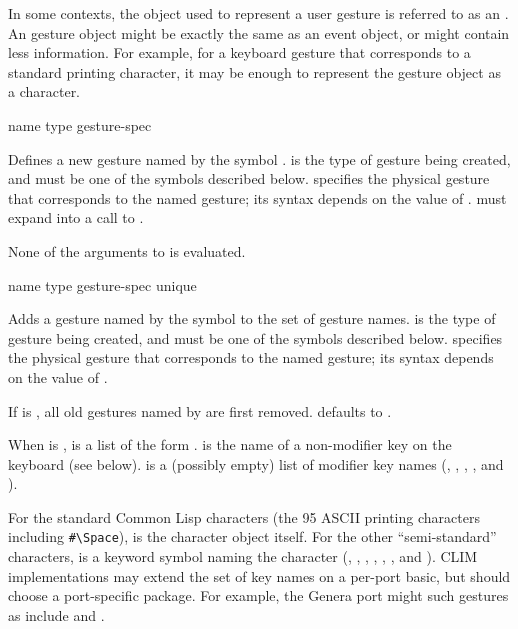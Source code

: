 In some contexts, the object used to represent a user gesture is referred to as
an .  An gesture object might be exactly the same as an
event object, or might contain less information.  For example, for a keyboard
gesture that corresponds to a standard printing character, it may be enough to
represent the gesture object as a character.


 {name type gesture-spec}

Defines a new gesture named by the symbol .   is the type of
gesture being created, and must be one of the symbols described below.
 specifies the physical gesture that corresponds to the named
gesture; its syntax depends on the value of .
 must expand into a call to .

None of the arguments to  is evaluated.

 {name type gesture-spec \key unique}

Adds a gesture named by the symbol  to the set of gesture names.
 is the type of gesture being created, and must be one of the symbols
described below.   specifies the physical gesture that
corresponds to the named gesture; its syntax depends on the value of .

If  is , all old gestures named by  are first
removed.   defaults to .

When  is ,  is a list of the form
.   is the name of a
non-modifier key on the keyboard (see below).   is a
(possibly empty) list of modifier key names (, ,
, , and ).

For the standard Common Lisp characters (the 95 ASCII printing characters
including \verb+#\Space+),  is the character object itself.  For
the other ``semi-standard'' characters,  is a keyword symbol
naming the character (, , , ,
, , and ).  CLIM implementations may extend
the set of key names on a per-port basic, but should choose a port-specific
package.  For example, the Genera port might such gestures as include
 and .

